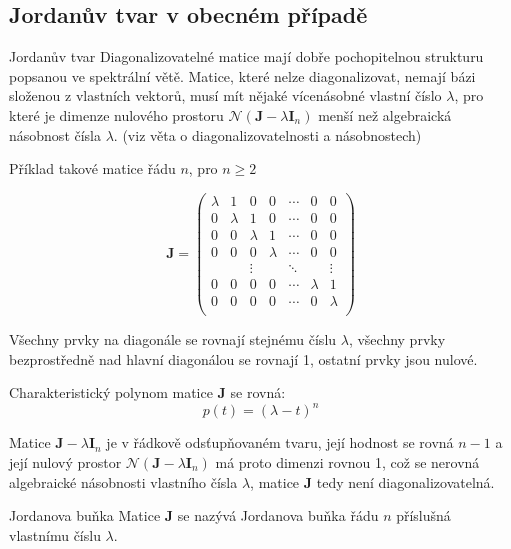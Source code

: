 \subsection{Jordanův tvar v obecném případě }
\begin{definiceN}{Jordanův tvar}
Diagonalizovatelné matice mají dobře pochopitelnou strukturu popsanou ve spektrální větě. Matice, které nelze diagonalizovat, nemají bázi složenou z vlastních vektorů, musí mít nějaké vícenásobné vlastní číslo $\lambda$, pro které je dimenze nulového prostoru $\mathcal{N}(\textbf{J}-\lambda \textbf{I}_n)$ menší než algebraická násobnost čísla $\lambda$. (viz věta o diagonalizovatelnosti a násobnostech)

Příklad takové matice řádu $n$, pro $n\geq2$

$$\textbf{J} = \begin{pmatrix}
  \lambda & 1 & 0 & 0 & \cdots & 0 & 0 \\
  0 & \lambda & 1 & 0 & \cdots & 0 & 0 \\
  0 & 0 & \lambda & 1 & \cdots & 0 & 0 \\
  0 & 0 & 0 & \lambda & \cdots & 0 & 0 \\
   &  & \vdots &  & \ddots &  & \vdots \\
  0 & 0 & 0 & 0 & \cdots & \lambda & 1 \\
  0 & 0 & 0 & 0 & \cdots & 0 & \lambda \\
\end{pmatrix}$$

Všechny prvky na diagonále se rovnají stejnému číslu $\lambda$, všechny prvky bezprostředně nad hlavní diagonálou  se rovnají 1, ostatní prvky jsou nulové.
\end{definiceN}
\begin{pozorovani}
Charakteristický polynom matice \textbf{J} se rovná:
$$p(t)=(\lambda - t)^n$$
\end{pozorovani}

\begin{pozorovani}
Matice $\textbf{J}-\lambda \textbf{I}_n$ je v řádkově odsťupňovaném tvaru, její hodnost se rovná $n-1$ a její nulový prostor $\mathcal{N}(\textbf{J}-\lambda \textbf{I}_n)$ má proto dimenzi rovnou 1, což se nerovná algebraické násobnosti vlastního čísla $\lambda$, matice \textbf{J} tedy není diagonalizovatelná.
\end{pozorovani}

\begin{definiceN}{Jordanova buňka}
Matice \textbf{J} se nazývá Jordanova buňka řádu $n$ příslušná vlastnímu číslu $\lambda$.
\end{definiceN}

